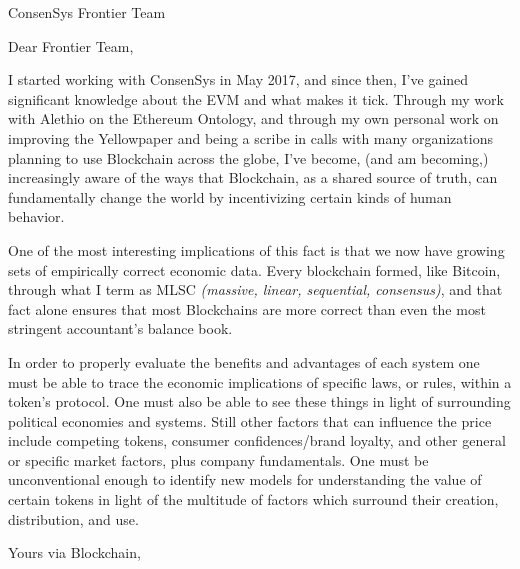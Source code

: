 \documentclass[
	pagenumber=false, %
	parskip=half, %
	fromalign=right, %
	foldmarks=true, %
	addrfield=false ]{scrlttr2}
\date{\today} %
\begin{document}
 
\begin{letter}{ConsenSys Frontier Team} %




\opening {Dear Frontier Team,}

	I started working with ConsenSys in May 2017, and since then, I've gained significant knowledge about the EVM and what makes it tick. Through my work with Alethio on the Ethereum Ontology, and through my own personal work on improving the Yellowpaper and being a scribe in calls with many organizations planning to use Blockchain across the globe, I've become, (and am becoming,) increasingly aware of the ways that Blockchain, as a shared source of truth, can fundamentally change the world by incentivizing certain kinds of human behavior.

	One of the most interesting implications of this fact is that we  now have growing sets of empirically correct economic data. Every blockchain formed, like Bitcoin, through what I term as MLSC \textit{(massive, linear, sequential, consensus)}, and that fact alone ensures that most Blockchains are more correct than even the most stringent accountant's balance book.
	
	In order to properly evaluate the benefits and advantages of each system one must be able to trace the economic implications of specific laws, or rules, within a token's protocol. One must also be able to see these things in light of surrounding political economies and systems. Still other factors that can influence the price include competing tokens, consumer confidences/brand loyalty, and other general or specific market factors, plus company fundamentals. One must be unconventional enough to identify new models for understanding the value of certain tokens in light of the multitude of factors which surround their creation, distribution, and use.

\closing{Yours via Blockchain,}



\end{letter}
 
\end{document}
